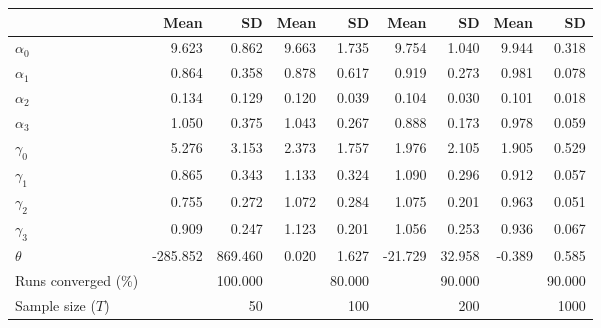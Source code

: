 
\begin{tabular}[t]{lrrrrrrrr}
\toprule
  & Mean & SD & Mean  & SD  & Mean   & SD   & Mean    & SD   \\
\midrule
$\alpha_{0}$ & 9.623 & 0.862 & 9.663 & 1.735 & 9.754 & 1.040 & 9.944 & 0.318\\
$\alpha_{1}$ & 0.864 & 0.358 & 0.878 & 0.617 & 0.919 & 0.273 & 0.981 & 0.078\\
$\alpha_{2}$ & 0.134 & 0.129 & 0.120 & 0.039 & 0.104 & 0.030 & 0.101 & 0.018\\
$\alpha_{3}$ & 1.050 & 0.375 & 1.043 & 0.267 & 0.888 & 0.173 & 0.978 & 0.059\\
$\gamma_{0}$ & 5.276 & 3.153 & 2.373 & 1.757 & 1.976 & 2.105 & 1.905 & 0.529\\
$\gamma_{1}$ & 0.865 & 0.343 & 1.133 & 0.324 & 1.090 & 0.296 & 0.912 & 0.057\\
$\gamma_{2}$ & 0.755 & 0.272 & 1.072 & 0.284 & 1.075 & 0.201 & 0.963 & 0.051\\
$\gamma_{3}$ & 0.909 & 0.247 & 1.123 & 0.201 & 1.056 & 0.253 & 0.936 & 0.067\\
$\theta$ & -285.852 & 869.460 & 0.020 & 1.627 & -21.729 & 32.958 & -0.389 & 0.585\\
Runs converged (\%) &  & 100.000 &  & 80.000 &  & 90.000 &  & 90.000\\
Sample size ($T$) &  & 50 &  & 100 &  & 200 &  & 1000\\
\bottomrule
\end{tabular}
